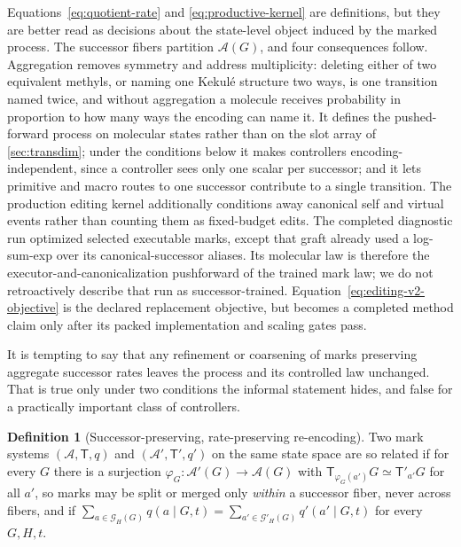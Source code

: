 \documentclass{article}
\newcommand{\A}{\mathcal{A}}
\newcommand{\T}{\mathsf{T}}
\newcommand{\Gset}{\mathcal{G}}
\theoremstyle{definition}
\newtheorem{definition}[theorem]{Definition}
\theoremstyle{remark}
\begin{document}
Equations~\eqref{eq:quotient-rate} and \eqref{eq:productive-kernel} are definitions, but they are better read as decisions about the state-level object induced by the marked process. The successor fibers partition $\A(G)$, and four consequences follow. Aggregation removes symmetry and address multiplicity: deleting either of two equivalent methyls, or naming one Kekul\'e structure two ways, is one transition named twice, and without aggregation a molecule receives probability in proportion to how many ways the encoding can name it. It defines the pushed-forward process on molecular states rather than on the slot array of \cref{sec:transdim}; under the conditions below it makes controllers encoding-independent, since a controller sees only one scalar per successor; and it lets primitive and macro routes to one successor contribute to a single transition. The production editing kernel additionally conditions away canonical self and virtual events rather than counting them as fixed-budget edits. The completed diagnostic run optimized selected executable marks, except that graft already used a log-sum-exp over its canonical-successor aliases. Its molecular law is therefore the executor-and-canonicalization pushforward of the trained mark law; we do not retroactively describe that run as successor-trained. Equation~\eqref{eq:editing-v2-objective} is the declared replacement objective, but becomes a completed method claim only after its packed implementation and scaling gates pass.

It is tempting to say that any refinement or coarsening of marks preserving aggregate successor rates leaves the process and its controlled law unchanged. That is true only under two conditions the informal statement hides, and false for a practically important class of controllers.

\begin{definition}[Successor-preserving, rate-preserving re-encoding]\label{def:reencoding}
Two mark systems $(\A,\T,q)$ and $(\A',\T',q')$ on the same state space are so related if for every $G$ there is a surjection $\varphi_G:\A'(G)\to\A(G)$ with $\T_{\varphi_G(a')}G\simeq\T'_{a'}G$ for all $a'$, so marks may be split or merged only \emph{within} a successor fiber, never across fibers, and if $\sum_{a\in\Gset_H(G)}q(a\mid G,t)=\sum_{a'\in\Gset'_H(G)}q'(a'\mid G,t)$ for every $G,H,t$.
\end{definition}
\end{document}
